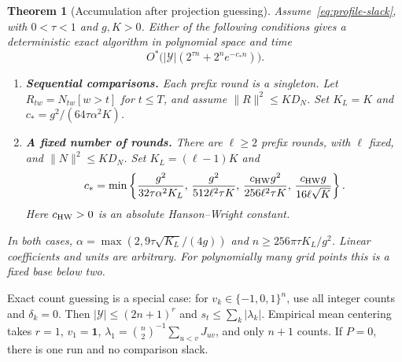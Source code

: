 \documentclass[11pt,a4paper]{article}
\newtheorem{theorem}{Theorem}[section]
\theoremstyle{definition}
\theoremstyle{remark}
\newcommand{\Ostar}{O^{*}}
\newcommand{\ind}{\mathbf 1}
\begin{document}
\begin{theorem}[Accumulation after projection guessing]\label{res:counts}
Assume~\eqref{eq:profile-slack}, with $0<\tau<1$ and $g,K>0$.
Either of the following conditions gives a deterministic exact algorithm
in polynomial space and time
\[
 \Ostar\bigl(|\mathcal Y|(2^{\tau n}+2^ne^{-c_*n})\bigr).
\]
\begin{enumerate}
\item \textbf{Sequential comparisons.} Each prefix round is a singleton.
Let $R_{tw}=N_{tw}[w>t]$ for $t\le T$, and assume $\|R\|^2\le KD_N$.
Set $K_L=K$ and
$c_*=g^2/(64\tau\alpha^2K)$.
\item \textbf{A fixed number of rounds.} There are $\ell\ge2$ prefix
rounds, with $\ell$ fixed, and $\|N\|^2\le KD_N$.
Set $K_L=(\ell-1)K$ and
\[
 c_*=\min\left\{
 \frac{g^2}{32\tau\alpha^2K_L},\,
 \frac{g^2}{512\ell^2\tau K},\,
 \frac{c_{\rm HW}g^2}{256\ell^2\tau K},\,
 \frac{c_{\rm HW}g}{16\ell\sqrt K}\right\}.
\]
Here $c_{\rm HW}>0$ is an absolute Hanson--Wright constant.
\end{enumerate}
In both cases, $\alpha=\max(2,9\tau\sqrt{K_L}/(4g))$ and
$n\ge256\pi\tau K_L/g^2$. Linear coefficients and units are arbitrary.
For polynomially many grid points this is a fixed base below two.
\end{theorem}

Exact count guessing is a special case: for
$v_k\in\{-1,0,1\}^n$, use all integer counts and $\delta_k=0$.
Then $|\mathcal Y|\le(2n+1)^r$ and $s_t\le\sum_k|\lambda_k|$.
Empirical mean centering takes $r=1$, $v_1=\ind$,
$\lambda_1=\binom n2^{-1}\sum_{u<v}J_{uv}$, and only $n+1$ counts.
If $P=0$, there is one run and no comparison slack.
\end{document}
